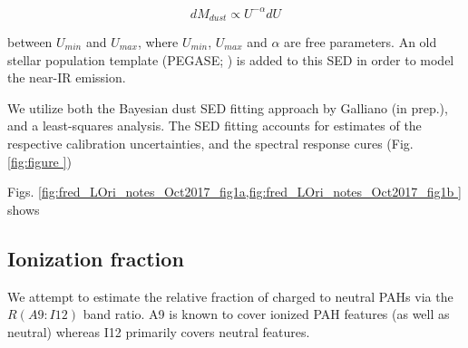           \begin{equation}
             \label{eq:U}
               dM_{dust}\propto{} U^{-\alpha}dU
          \end{equation}

          between $U_{min}$ and $U_{max}$, where $U_{min}$, $U_{max}$ and $\alpha{}$ are free parameters. An old stellar population template (PEGASE; \citep{fioc97}) is added to this SED in order to model the near-IR emission.

          We utilize both the Bayesian dust SED fitting approach by Galliano (in prep.), and a least-squares analysis. The SED fitting accounts for estimates of the respective calibration uncertainties, and the spectral response cures (Fig. \ref{fig:figure  })

          Figs. \ref{fig:fred_LOri_notes_Oct2017_fig1a,fig:fred_LOri_notes_Oct2017_fig1b } shows

		\subsection{Ionization fraction}
			We attempt to estimate the relative fraction of charged to neutral PAHs via the $R(A9:I12)$ band ratio. A9 is known to cover ionized PAH features (as well as neutral) whereas I12 primarily covers neutral features.


